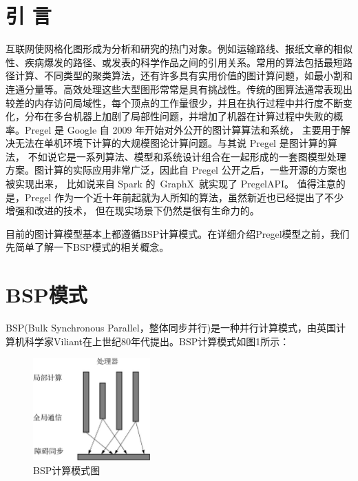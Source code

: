 \documentclass[10pt,a4paper,twocolumn,twoside,UTF8]{ctexart}
\begin{document}

\pagestyle{maincontent}%



\section{引 \quad 言}
互联网使网格化图形成为分析和研究的热门对象。例如运输路线、报纸文章的相似性、疾病爆发的路径、或发表的科学作品之间的引用关系。常用的算法包括最短路径计算、不同类型的聚类算法，还有许多具有实用价值的图计算问题，如最小割和连通分量等。高效处理这些大型图形常常是具有挑战性。传统的图算法通常表现出较差的内存访问局域性，每个顶点的工作量很少，并且在执行过程中并行度不断变化，分布在多台机器上加剧了局部性问题，并增加了机器在计算过程中失败的概率。Pregel 是 Google 自 2009 年开始对外公开的图计算算法和系统， 主要用于解决无法在单机环境下计算的大规模图论计算问题。与其说 Pregel 是图计算的算法， 不如说它是一系列算法、模型和系统设计组合在一起形成的一套图模型处理方案。图计算的实际应用非常广泛，因此自 Pregel 公开之后，一些开源的方案也被实现出来， 比如说来自 Spark 的 GraphX 就实现了 PregelAPI。 值得注意的是，Pregel 作为一个近十年前起就为人所知的算法，虽然新近也已经提出了不少增强和改进的技术， 但在现实场景下仍然是很有生命力的。\par
目前的图计算模型基本上都遵循BSP计算模式。在详细介绍Pregel模型之前，我们先简单了解一下BSP模式的相关概念。

\newpage
\section{BSP模式}
BSP(Bulk Synchronous Parallel，整体同步并行)是一种并行计算模式，由英国计算机科学家Viliant在上世纪80年代提出。BSP计算模式如图1所示：
	\begin{figure}[htbp]
		\centering
		\includegraphics[width=0.4\textwidth]{img//pic1.png}
		\caption{BSP计算模式图}
		\label{pic1}
	\end{figure}
	
\end{document}
